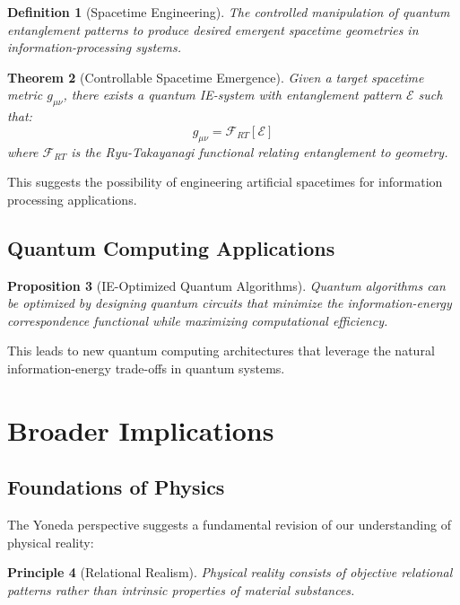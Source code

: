 \documentclass[12pt,a4paper]{article}
\newtheorem{theorem}{Theorem}[section]
\newtheorem{proposition}[theorem]{Proposition}
\newtheorem{definition}[theorem]{Definition}
\newtheorem{principle}[theorem]{Principle}
\begin{document}
\begin{definition}[Spacetime Engineering]
The controlled manipulation of quantum entanglement patterns to produce desired emergent spacetime geometries in information-processing systems.
\end{definition}

\begin{theorem}[Controllable Spacetime Emergence]
Given a target spacetime metric $g_{\mu\nu}$, there exists a quantum IE-system with entanglement pattern $\mathcal{E}$ such that:
\[
g_{\mu\nu} = \mathcal{F}_{RT}[\mathcal{E}]
\]
where $\mathcal{F}_{RT}$ is the Ryu-Takayanagi functional relating entanglement to geometry.
\end{theorem}

This suggests the possibility of engineering artificial spacetimes for information processing applications.

\subsection{Quantum Computing Applications}

\begin{proposition}[IE-Optimized Quantum Algorithms]
Quantum algorithms can be optimized by designing quantum circuits that minimize the information-energy correspondence functional while maximizing computational efficiency.
\end{proposition}

This leads to new quantum computing architectures that leverage the natural information-energy trade-offs in quantum systems.

\section{Broader Implications}

\subsection{Foundations of Physics}

The Yoneda perspective suggests a fundamental revision of our understanding of physical reality:

\begin{principle}[Relational Realism]
Physical reality consists of objective relational patterns rather than intrinsic properties of material substances.
\end{principle}
\end{document}
